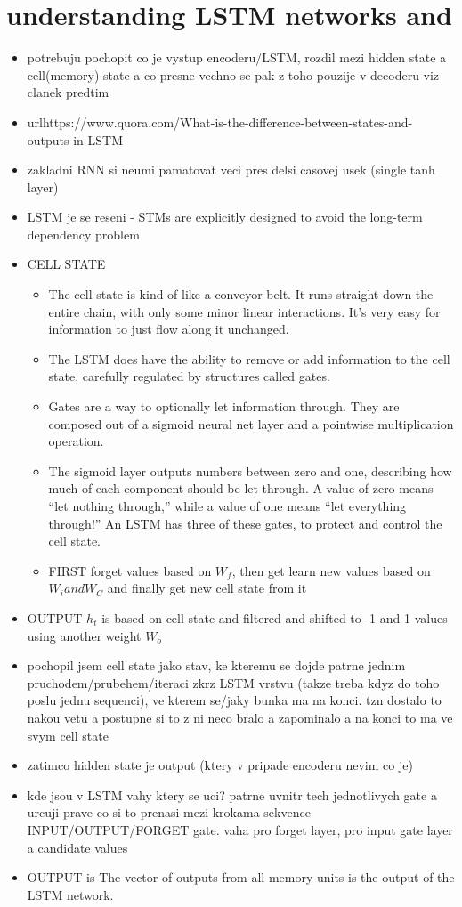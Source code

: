 \section{understanding LSTM networks and }\label{LSTM}
\begin{itemize}
  \item potrebuju pochopit co je vystup encoderu/LSTM, rozdil mezi hidden state a cell(memory) state a co presne vechno se pak z toho pouzije v decoderu viz clanek predtim
  \item url{https://www.quora.com/What-is-the-difference-between-states-and-outputs-in-LSTM}
  \item zakladni RNN si neumi pamatovat veci pres delsi casovej usek (single tanh layer)
  \item LSTM je se reseni - STMs are explicitly designed to avoid the long-term dependency problem
  \item CELL STATE
  \begin{itemize}
    \item The cell state is kind of like a conveyor belt. It runs straight down the entire chain, with only some minor linear interactions. It’s very easy for information to just flow along it unchanged.
    \item The LSTM does have the ability to remove or add information to the cell state, carefully regulated by structures called gates.
    \item Gates are a way to optionally let information through. They are composed out of a sigmoid neural net layer and a pointwise multiplication operation.
    \item The sigmoid layer outputs numbers between zero and one, describing how much of each component should be let through. A value of zero means “let nothing through,” while a value of one means “let everything through!” An LSTM has three of these gates, to protect and control the cell state.
    \item FIRST forget values based on $W_f$, then get learn new values based on $W_i and W_C$ and finally get new cell state from it
  \end{itemize}
  \item OUTPUT $h_t$ is based on cell state and filtered and shifted to -1 and 1 values using another weight $W_o$
  \item pochopil jsem cell state jako stav, ke kteremu se dojde patrne jednim pruchodem/prubehem/iteraci zkrz LSTM vrstvu (takze treba kdyz do toho poslu jednu sequenci), ve kterem se/jaky bunka ma na konci. tzn dostalo to nakou vetu a postupne si to z ni neco bralo a zapominalo a na konci to ma ve svym cell state
  \item zatimco hidden state je output (ktery v pripade encoderu nevim co je)
  \item kde jsou v LSTM vahy ktery se uci? patrne uvnitr tech jednotlivych gate a urcuji prave co si to prenasi mezi krokama sekvence INPUT/OUTPUT/FORGET gate. vaha pro forget layer, pro input gate layer a candidate values
  \item OUTPUT is The vector of outputs from all memory units is the output of the LSTM network.

\end{itemize}

